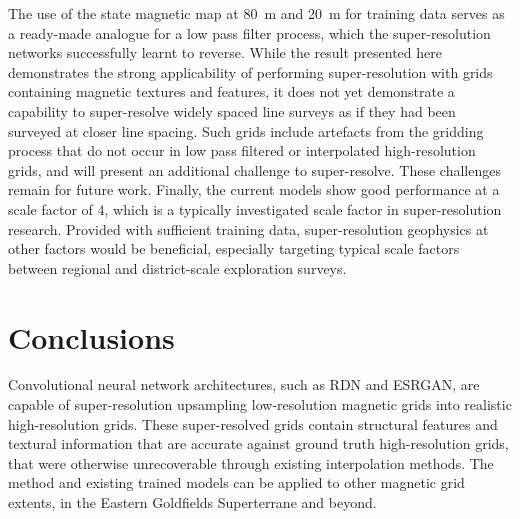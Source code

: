 \documentclass[manuscript.tex]{subfiles}
\begin{document}
The use of the state magnetic map at \qty{80}{\metre} and \qty{20}{\metre} for training data serves as a ready-made analogue for a low pass filter process, which the super-resolution networks successfully learnt to reverse.
While the result presented here demonstrates the strong applicability of performing super-resolution with grids containing magnetic textures and features, it does not yet demonstrate a capability to super-resolve widely spaced line surveys as if they had been surveyed at closer line spacing.
Such grids include artefacts from the gridding process that do not occur in low pass filtered or interpolated high-resolution grids, and will present an additional challenge to super-resolve.
These challenges remain for future work.
Finally, the current models show good performance at a scale factor of \num{4}, which is a typically investigated scale factor in super-resolution research.
Provided with sufficient training data, super-resolution geophysics at other factors would be beneficial, especially targeting typical scale factors between regional and district-scale exploration surveys.

\section{Conclusions}
Convolutional neural network architectures, such as RDN and ESRGAN, are capable of super-resolution upsampling low-resolution magnetic grids into realistic high-resolution grids.
These super-resolved grids contain structural features and textural information that are accurate against ground truth high-resolution grids, that were otherwise unrecoverable through existing interpolation methods.
The method and existing trained models can be applied to other magnetic grid extents, in the Eastern Goldfields Superterrane and beyond.


\printbibliography{}
\end{document}
